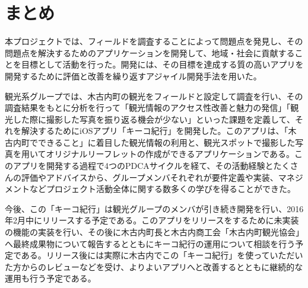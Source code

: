 \section{まとめ}
本プロジェクトでは、フィールドを調査することによって問題点を発見し、その問題点を解決するためのアプリケーションを開発して、地域・社会に貢献することを目標として活動を行った。開発には、その目標を達成する質の高いアプリを開発するために評価と改善を繰り返すアジャイル開発手法を用いた。
\par 観光系グループでは、木古内町の観光をフィールドと設定して調査を行い、その調査結果をもとに分析を行って「観光情報のアクセス性改善と魅力の発信」「観光した際に撮影した写真を振り返る機会が少ない」といった課題を定義して、それを解決するためにiOSアプリ「キーコ紀行」を開発した。このアプリは、「木古内町でできること」に着目した観光情報の利用と、観光スポットで撮影した写真を用いてオリジナルリーフレットの作成ができるアプリケーションである。このアプリを開発する過程で4つのPDCAサイクルを経て、その活動経験とたくさんの評価やアドバイスから、グループメンバそれぞれが要件定義や実装、マネジメントなどプロジェクト活動全体に関する数多くの学びを得ることができた。
\par 今後、この「キーコ紀行」は観光グループのメンバが引き続き開発を行い、2016年2月中にリリースする予定である。このアプリをリリースをするために未実装の機能の実装を行い、その後に木古内町長と木古内商工会「木古内町観光協会」へ最終成果物について報告するとともにキーコ紀行の運用について相談を行う予定である。リリース後には実際に木古内でこの「キーコ紀行」を使っていただいた方からのレビューなどを受け、よりよいアプリへと改善するとともに継続的な運用も行う予定である。
